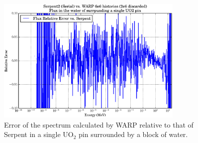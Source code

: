 \begin{figure}[h!] 
\centering
\includegraphics[width=0.8\textwidth]{graphics/finalresults/pincell_spec_err.eps}
\caption{Error of the spectrum calculated by WARP relative to that of Serpent in a single UO$_2$ pin surrounded by a block of water. \label{pincell_spec_err} }
\end{figure}

